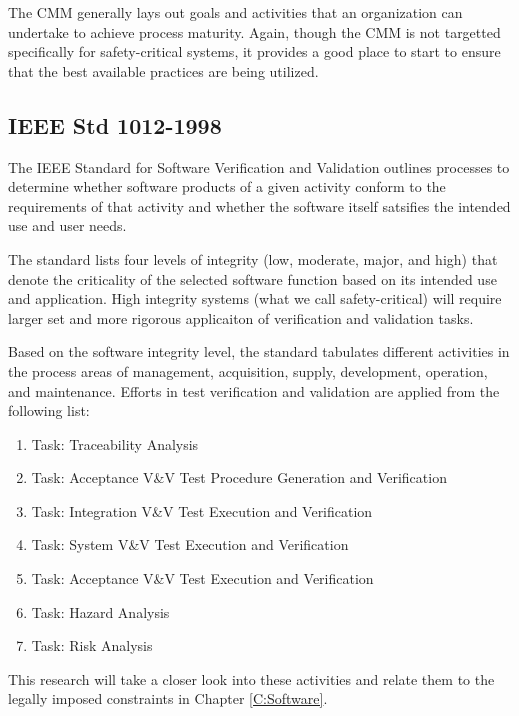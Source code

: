 The CMM generally lays out goals and activities that an organization can
undertake to achieve process maturity. Again, though the CMM is not targetted
specifically for safety-critical systems, it provides a good place to start to
ensure that the best available practices are being utilized.

\subsection{IEEE Std 1012-1998}
The IEEE Standard for Software Verification and Validation \cite{IEEE-std-verif}
outlines processes to determine whether software products of a given activity
conform to the requirements of that activity and whether the software itself
satsifies the intended use and user needs.

The standard lists four levels of integrity (low, moderate, major, and high)
that denote the criticality of the selected software function based on its
intended use and application. High integrity systems (what we call 
safety-critical) will require larger set and more rigorous applicaiton of
verification and validation tasks.

Based on the software integrity level, the standard tabulates different
activities in the process areas of management, acquisition, supply, development,
operation, and maintenance. Efforts in test verification and validation are
applied from the following list:
\singlespace
\begin{enumerate}
  \item Task: Traceability Analysis
  \item Task: Acceptance V\&V Test Procedure Generation and Verification
  \item Task: Integration V\&V Test Execution and Verification
  \item Task: System V\&V Test Execution and Verification
  \item Task: Acceptance V\&V Test Execution and Verification
  \item Task: Hazard Analysis
  \item Task: Risk Analysis
\end{enumerate}
\doublespace
This research will take a closer look into these activities and relate them to
the legally imposed constraints in Chapter \ref{C:Software}.


